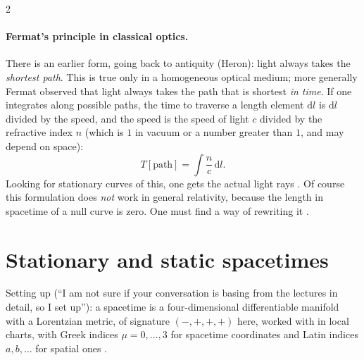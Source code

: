 \begin{paracol}{2}
\paragraph{Fermat's principle in classical optics.} There is an earlier form, going back to antiquity (Heron): light always takes the \emph{shortest path}. This is true only in a homogeneous optical medium; more generally Fermat observed that light always takes the path that is shortest \emph{in time}. If one integrates along possible paths, the time to traverse a length element $\mathrm dl$ is $\mathrm dl$ divided by the speed, and the speed is the speed of light $c$ divided by the refractive index $n$ (which is $1$ in vacuum or a number greater than $1$, and may depend on space):
\[
  T[\text{path}]=\int\frac{n}{c}\,\mathrm dl.
\]
Looking for stationary curves of this, one gets the actual light rays .
Of course this formulation does \emph{not} work in general relativity, because the length in spacetime of a null curve is zero. One must find a way of rewriting it .

\section{Stationary and static spacetimes}\label{sec:c16-static}

Setting up (``I am not sure if your conversation is basing from the lectures in detail, so I set up''): a spacetime is a four-dimensional differentiable manifold with a Lorentzian metric, of signature $(-,+,+,+)$ here, worked with in local charts, with Greek indices $\mu=0,\dots,3$ for spacetime coordinates and Latin indices $a,b,\dots$ for spatial ones .


\end{paracol}
